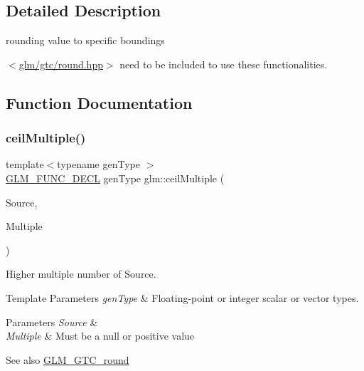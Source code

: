 \subsection{Detailed Description}
rounding value to specific boundings 

$<$\mbox{\hyperlink{round_8hpp}{glm/gtc/round.\+hpp}}$>$ need to be included to use these functionalities. 

\subsection{Function Documentation}
\mbox{\label{group__gtc__round_gac84898c466e609cdd2e81d9ba907d9e8}} 
\subsubsection{\texorpdfstring{ceilMultiple()}{ceilMultiple()}\hspace{0.1cm}{\footnotesize\ttfamily [1/2]}}
{\footnotesize\ttfamily template$<$typename gen\+Type $>$ \\
\mbox{\hyperlink{setup_8hpp_ab2d052de21a70539923e9bcbf6e83a51}{G\+L\+M\+\_\+\+F\+U\+N\+C\+\_\+\+D\+E\+CL}} gen\+Type glm\+::ceil\+Multiple (\begin{DoxyParamCaption}\item[{gen\+Type}]{Source,  }\item[{gen\+Type}]{Multiple }\end{DoxyParamCaption})}

Higher multiple number of Source.


\begin{DoxyTemplParams}{Template Parameters}
{\em gen\+Type} & Floating-\/point or integer scalar or vector types. \\
\hline
\end{DoxyTemplParams}

\begin{DoxyParams}{Parameters}
{\em Source} & \\
\hline
{\em Multiple} & Must be a null or positive value\\
\hline
\end{DoxyParams}
\begin{DoxySeeAlso}{See also}
\mbox{\hyperlink{group__gtc__round}{G\+L\+M\+\_\+\+G\+T\+C\+\_\+round}} 
\end{DoxySeeAlso}


